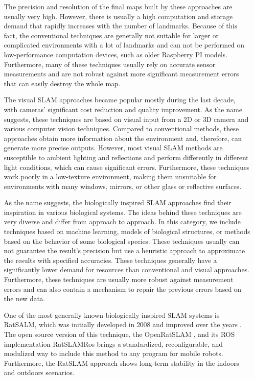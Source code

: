 The precision and resolution of the final maps built by these approaches are usually very high. However, there is usually a high computation and storage demand that rapidly increases with the number of landmarks. Because of this fact, the conventional techniques are generally not suitable for larger or complicated environments with a lot of landmarks and can not be performed on low-performance computation devices, such as older Raspberry PI models. Furthermore, many of these techniques usually rely on accurate sensor measurements and are not robust against more significant measurement errors that can easily destroy the whole map.\par
The visual SLAM approaches became popular mostly during the last decade, with cameras' significant cost reduction and quality improvement. As the name suggests, these techniques are based on visual input from a 2D or 3D camera and various computer vision techniques. Compared to conventional methods, these approaches obtain more information about the environment and, therefore, can generate more precise outputs. However, most visual SLAM methods are susceptible to ambient lighting and reflections and perform differently in different light conditions, which can cause significant errors. Furthermore, these techniques work poorly in a low-texture environment, making them unsuitable for environments with many windows, mirrors, or other glass or reflective surfaces.\cite{visualSLAM}\par
As the name suggests, the biologically inspired SLAM approaches find their inspiration in various biological systems. The ideas behind these techniques are very diverse and differ from approach to approach. In this category, we include techniques based on machine learning, models of biological structures, or methods based on the behavior of some biological species. These techniques usually can not guarantee the result's precision but use a heuristic approach to approximate the results with specified accuracies. These techniques generally have a significantly lower demand for resources than conventional and visual approaches. Furthermore, these techniques are usually more robust against measurement errors and can also contain a mechanism to repair the previous errors based on the new data.\par
One of the most generally known biologically inspired SLAM systems is RatSALM, which was initially developed in 2008 and improved over the years \cite{RatSLAM}. The open source version of this technique, the OpenRatSLAM \cite{OpenRatSLAM}, and its ROS implementation RatSLAMRos \cite{RatSLAMROS} brings a standardized, reconfigurable, and modulized way to include this method to any program for mobile robots. Furthermore, the RatSLAM approach shows long-term stability in the indoors and outdoors scenarios.\cite{RatSLAMExp1}\cite{RatSLAMExp2}\cite{RatSLAMExp3}\cite{RatSLAMExp4}\par

